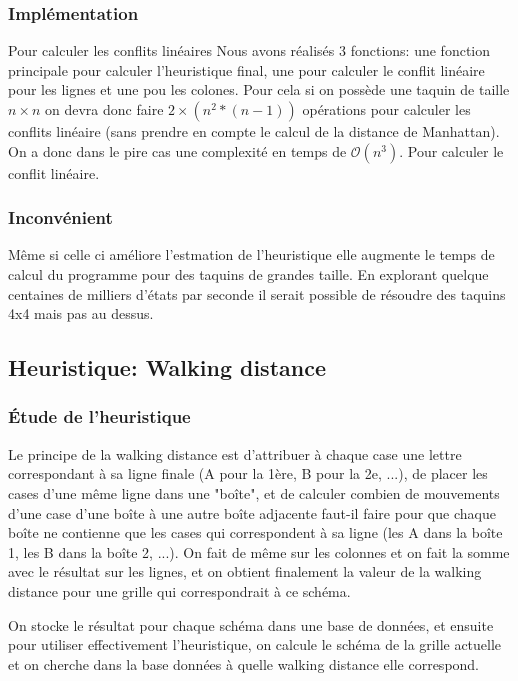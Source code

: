 \documentclass[a4paper, 12pt]{article}
\begin{document}
    \subsubsection{Implémentation}
    
    Pour calculer les conflits linéaires Nous avons réalisés 3 fonctions: une fonction principale pour calculer l'heuristique final, une pour calculer le conflit linéaire pour les lignes et une pou les colones. Pour cela si on possède une taquin de taille $n \times n$ on devra donc faire $2 \times (n^2*(n-1))$ opérations pour calculer les conflits linéaire (sans prendre en compte le calcul de la distance de Manhattan). 
    On a donc dans le pire cas une complexité en temps de $ \mathcal{O}(n^3)$. Pour calculer le conflit linéaire.

    \subsubsection{Inconvénient}
    
    Même si celle ci améliore l'estmation de l'heuristique elle augmente le temps de calcul du programme pour des taquins de grandes taille. En explorant quelque centaines de milliers d'états par seconde il serait possible de résoudre des taquins 4x4 mais pas au dessus. 

    \subsection{Heuristique: Walking distance}

    \subsubsection{Étude de l'heuristique}

    Le principe de la walking distance est d'attribuer à chaque case une lettre correspondant à sa ligne finale (A pour la 1ère, B pour la 2e, ...), de placer les cases d'une même ligne dans une "boîte", et de calculer combien de mouvements d'une case d'une boîte à une autre boîte adjacente faut-il faire pour que chaque boîte ne contienne que les cases qui correspondent à sa ligne (les A dans la boîte 1, les B dans la boîte 2, ...).
    On fait de même sur les colonnes et on fait la somme avec le résultat sur les lignes, et on obtient finalement la valeur de la walking distance pour une grille qui correspondrait à ce schéma.
    
    On stocke le résultat pour chaque schéma dans une base de données, et ensuite pour utiliser effectivement l'heuristique, on calcule le schéma de la grille actuelle et on cherche dans la base données à quelle walking distance elle correspond. 
\end{document}
